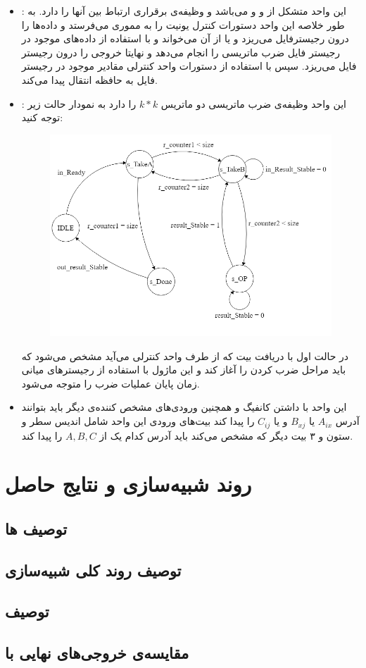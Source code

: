 \documentclass[12pt,onecolumn,a4paper,fleqn]{article}
\begin{document}
\begin{itemize}
	
	\item 
	:
	این واحد متشکل از  و  و  می‌باشد و وظیفه‌ی برقراری ارتباط بین آنها را دارد. به طور خلاصه این واحد دستورات کنترل یونیت را به مموری می‌فرستد و داده‌ها را درون رجیسترفایل می‌ریزد و یا از آن می‌خواند و  با استفاده از داده‌های موجود در رجیستر فایل ضرب ماتریسی را انجام می‌دهد و نهایتا خروجی را درون رجیستر فایل می‌ریزد. سپس با استفاده از دستورات واحد کنترلی مقادیر موجود در رجیستر فایل به حافظه انتقال پیدا می‌کند.
	\item 
	:
	این واحد وظیفه‌ی ضرب ماتریسی دو ماتریس $k*k$ را دارد به نمودار حالت زیر توجه کنید:
	\begin{figure}[h]
		\centering
		\includegraphics[width=0.5\linewidth]{source/square_matrix.png}
		\caption{}
	\end{figure}
	در حالت اول با دریافت بیت  که از طرف واحد کنترلی می‌آید مشخص می‌شود که باید مراحل ضرب کردن را آغاز کند و این ماژول با استفاده از رجیستر‌های میانی زمان پایان عملیات ضرب را متوجه می‌شود.
	\item 
	این واحد با داشتن کانفیگ و همچنین ورودی‌های مشخص کننده‌ی دیگر باید بتوانند آدرس $A_{ix}$ یا $B_{xj}$ و یا $C_{ij}$ را پیدا کند بیت‌های ورودی این واحد شامل اندیس سطر و ستون و ۳ بیت دیگر که مشخص می‌کند باید آدرس کدام یک از $A,B,C$ را پیدا کند.
\end{itemize}

\pagebreak


\pagebreak
\section{روند شبیه‌سازی و نتایج حاصل}
\subsection{توصیف ها}
\subsection{توصیف روند کلی شبیه‌سازی}
\subsection{توصیف }
\subsection{مقایسه‌ی خروجی‌های نهایی با }
\end{document}
